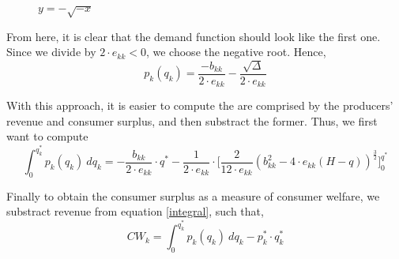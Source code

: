 \documentclass[12pt]{article}
\begin{document}
\begin{figure}[H]
    \begin{minipage}{0.45\textwidth}
\caption{$y = \sqrt{-x}$}
\end{minipage}\hfill
\begin{minipage}{0.45\textwidth}
\caption{$y = -\sqrt{-x}$}
    \end{minipage}
\end{figure}

From here, it is clear that the demand function should look like the first one. Since we divide by $2 \cdot e_{kk} <0$, we choose the negative root. Hence,
\begin{equation*}
p_k(q_k) = \frac{-b_{kk}}{2 \cdot e_{kk}} - \frac{\sqrt{\Delta}}{2 \cdot e_{kk}}
\end{equation*}

With this approach, it is easier to compute the are comprised by the producers' revenue and consumer surplus, and then substract the former. Thus, we first want to compute
\begin{equation} \label{integral}
\int_0^{q_k^*} p_k(q_k) \ dq_k = -\frac{b_{kk}}{2 \cdot e_{kk}} \cdot q^* -\frac{1}{2 \cdot e_{kk}} \cdot \bigg[\frac{2}{12 \cdot e_{kk}} (b_{kk}^2 - 4 \cdot e_{kk}(H - q))^{\frac{3}{2}}\bigg]_0^{q^*}
\end{equation}

Finally to obtain the consumer surplus as a measure of consumer welfare, we substract revenue from equation \ref{integral}, such that,
\begin{equation}
CW_k= \int_0^{q_k^*} p_k(q_k) \ dq_k  - p_k^* \cdot q_k^*
\end{equation}

%
\end{document}

